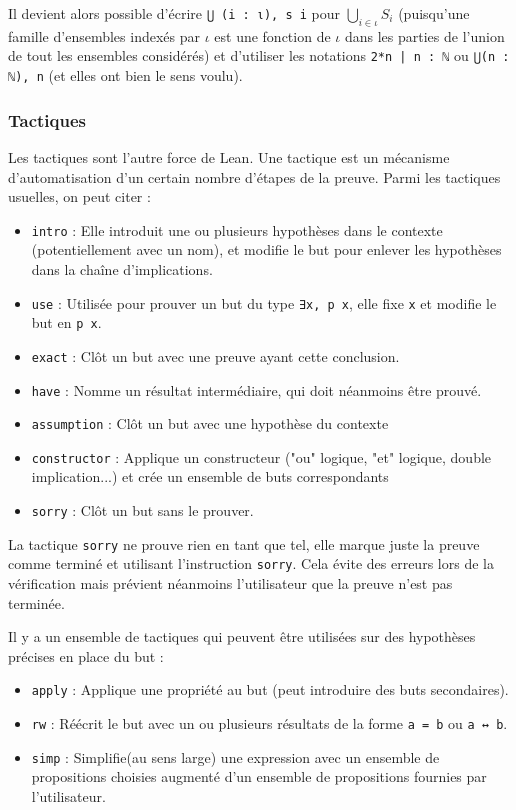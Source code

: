\documentclass[a4paper, 12pt]{article}
\newcommand{\lean}[1]{\texttt{#1}}
\begin{document}
Il devient alors possible d'écrire \lean{⋃ (i : ι), s i} pour $\bigcup_{i\in\iota} S_i$ (puisqu'une famille d'ensembles indexés par $\iota$ est une fonction de $\iota$ dans les parties de l'union de tout les ensembles considérés) et d'utiliser les notations \lean{{2*n | n : ℕ}} ou \lean{⋃(n : ℕ), {n}} (et elles ont bien le sens voulu).

\subsubsection{Tactiques}

Les tactiques sont l'autre force de Lean. Une tactique est un mécanisme d'automatisation d'un certain nombre d'étapes de la preuve. Parmi les tactiques usuelles, on peut citer :
\begin{itemize}
    \item \lean{intro} : Elle introduit une ou plusieurs hypothèses dans le contexte (potentiellement avec un nom), et modifie le but pour enlever les hypothèses dans la chaîne d'implications.
    \item \lean{use} : Utilisée pour prouver un but du type \lean{∃x, p x}, elle fixe \lean{x} et modifie le but en \lean{p x}.
    \item \lean{exact} : Clôt un but avec une preuve ayant cette conclusion.
    \item \lean{have} : Nomme un résultat intermédiaire, qui doit néanmoins être prouvé.
    \item \lean{assumption} : Clôt un but avec une hypothèse du contexte
    \item \lean{constructor} : Applique un constructeur ("ou" logique, "et" logique, double implication...) et crée un ensemble de buts correspondants
    \item \lean{sorry} : Clôt un but sans le prouver.
\end{itemize}

La tactique \lean{sorry} ne prouve rien en tant que tel, elle marque juste la preuve comme terminé et utilisant l'instruction \lean{sorry}. Cela évite des erreurs lors de la vérification mais prévient néanmoins l'utilisateur que la preuve n'est pas terminée.

Il y a un ensemble de tactiques qui peuvent être utilisées sur des hypothèses précises en place du but :
\begin{itemize}
    \item \lean{apply} : Applique une propriété au but (peut introduire des buts secondaires).
    \item \lean{rw} : Réécrit le but avec un ou plusieurs résultats de la forme \lean{a = b} ou \lean{a ↔ b}.
    \item \lean{simp} : Simplifie(au sens large) une expression avec un ensemble de propositions choisies augmenté d'un ensemble de propositions fournies par l'utilisateur.
\end{itemize}
\end{document}
